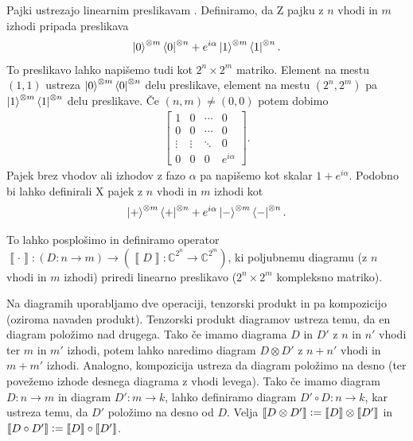 \documentclass[mat1]{fmfdelo}
\newcommand{\C}{\mathbb C}
\newcommand{\interpret}[1]{\left\llbracket #1 \right\rrbracket}
\newcommand{\defeq}{\vcentcolon=}
\begin{document}
Pajki ustrezajo linearnim preslikavam \cite[poglavje 1.1]{Backens}. Definiramo, da Z pajku z \(n\) vhodi in \(m\) izhodi pripada preslikava
\begin{align*}
    \ket{0}^{\otimes m} \bra{0}^{\otimes n} + e^{i\alpha}\ket{1}^{\otimes m} \bra{1}^{\otimes n}.
\end{align*}
To preslikavo lahko napišemo tudi kot \(2^n\times 2^m\) matriko. Element na mestu \((1,1)\) ustreza \(\ket{0}^{\otimes m} \bra{0}^{\otimes n}\) delu preslikave, element na mestu \((2^n, 2^m)\) pa \(\ket{1}^{\otimes m} \bra{1}^{\otimes n}\) delu preslikave. Če \((n,m)\neq (0,0)\) potem dobimo
\begin{align*}
    \begin{bmatrix}
        1 & 0 & \cdots & 0 \\
        0 & 0 & \cdots & 0 \\
        \vdots & \vdots & \ddots & 0 \\
        0 & 0 & 0 & e^{i\alpha} 
        \end{bmatrix}.
\end{align*}
Pajek brez vhodov ali izhodov z fazo \(\alpha\) pa napišemo kot skalar \(1+e^{i\alpha}\).
Podobno bi lahko definirali X pajek z \(n\) vhodi in \(m\) izhodi \cite[Poglavje 3.1]{workingcs} kot
\begin{align*}
    \ket{+}^{\otimes m} \bra{+}^{\otimes n} + e^{i\alpha}\ket{-}^{\otimes m} \bra{-}^{\otimes n}.
\end{align*}

To lahko posplošimo in definiramo operator \(\interpret{\cdot}: (D:n\to m)\to (\interpret{D}: \C^{2^n} \to \C^{2^m})\), ki poljubnemu diagramu (z \(n\) vhodi in \(m\) izhodi) priredi linearno preslikavo (\(2^n\times 2^m\) kompleksno matriko).

Na diagramih uporabljamo dve operaciji, tenzorski produkt in pa kompozicijo (oziroma navaden produkt). Tenzorski produkt diagramov ustreza temu, da en diagram položimo nad drugega. Tako če imamo diagrama \(D\) in \(D'\) z \(n\) in \(n'\) vhodi ter \(m\) in \(m'\) izhodi, potem lahko naredimo diagram \(D\otimes D'\) z \(n+n'\) vhodi in \(m+m'\) izhodi. Analogno, kompozicija ustreza da diagram položimo na desno (ter povežemo izhode desnega diagrama z vhodi levega). Tako če imamo diagram \(D:n\to m\) in diagram \(D':m\to k\), lahko definiramo diagram \(D'\circ D: n\to k\), kar ustreza temu, da \(D'\) položimo na desno od \(D\). Velja \(\interpret{D\otimes D'}\defeq \interpret{D} \otimes \interpret{D'}\) in \(\interpret{D\circ D'} \defeq \interpret{D}\circ \interpret{ D'}\).
\end{document}
